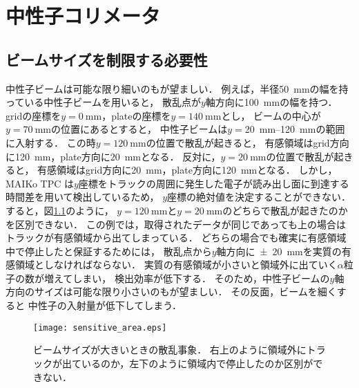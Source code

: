 \documentclass[../master]{subfiles}
\begin{document}
\chapter{中性子コリメータ}
\label{chap::collimator}
\section{ビームサイズを制限する必要性}
中性子ビームは可能な限り細いのもが望ましい．
例えば，半径\SI{50}{\milli\metre}の幅を持っている中性子ビームを用いると，
散乱点が$y$軸方向に\SI{100}{\milli\metre}の幅を持つ．
gridの座標を$y = \SI{0}{\milli\metre}$，plateの座標を$y = \SI{140}{\milli\metre}$とし，
ビームの中心が$y = \SI{70}{\milli\metre}$の位置にあるとすると，
中性子ビームは$y = $\SIrange{20}{120}{\milli\metre}の範囲に入射する．
この時$y = \SI{120}{\milli\metre}$の位置で散乱が起きると，
有感領域はgrid方向に\SI{120}{\milli\metre}，plate方向に\SI{20}{\milli\metre}となる．
反対に，$y = \SI{20}{\milli\metre}$の位置で散乱が起きると，
有感領域はgrid方向に\SI{20}{\milli\metre}，plate方向に\SI{120}{\milli\metre}となる．
しかし，MAIKo TPC は$y$座標をトラックの周囲に発生した電子が読み出し面に到達する時間差を用いて検出しているため，
$y$座標の絶対値を決定することができない．
すると，図\ref{fig::sensitive_area}のように，
$y = \SI{120}{\milli\metre}$と$y = \SI{20}{\milli\metre}$のどちらで散乱が起きたのかを区別できない．
この例では，取得されたデータが同じであっても上の場合はトラックが有感領域から出てしまっている．
どちらの場合でも確実に有感領域中で停止したと保証するためには，
散乱点から$y$軸方向に\SI{\pm20}{\milli\metre}を実質の有感領域としなければならない．
実質の有感領域が小さいと領域外に出ていく$\alpha$粒子の数が増えてしまい，
検出効率が低下する．
そのため，中性子ビームの$y$軸方向のサイズは可能な限り小さいのもが望ましい．
その反面，ビームを細くすると
中性子の入射量が低下してしまう．
\begin{figure}
  \centering
  \texttt{[image: sensitive\_area.eps]}
  \caption[ビームサイズが大きいときの散乱事象．]
          {ビームサイズが大きいときの散乱事象．
            右上のように領域外にトラックが出ているのか，左下のように領域内で停止したのか区別ができない．}
  \label{fig::sensitive_area}
\end{figure}
\end{document}
